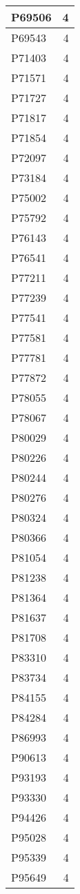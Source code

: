 \documentclass[
]{book}
\theoremstyle{definition}
\theoremstyle{definition}
\theoremstyle{definition}
\theoremstyle{definition}
\theoremstyle{remark}
\begin{document}
\begin{table}
\begin{tabular}{l|r}
\hline
P69506 & 4\\
\hline
P69543 & 4\\
\hline
P71403 & 4\\
\hline
P71571 & 4\\
\hline
P71727 & 4\\
\hline
P71817 & 4\\
\hline
P71854 & 4\\
\hline
P72097 & 4\\
\hline
P73184 & 4\\
\hline
P75002 & 4\\
\hline
P75792 & 4\\
\hline
P76143 & 4\\
\hline
P76541 & 4\\
\hline
P77211 & 4\\
\hline
P77239 & 4\\
\hline
P77541 & 4\\
\hline
P77581 & 4\\
\hline
P77781 & 4\\
\hline
P77872 & 4\\
\hline
P78055 & 4\\
\hline
P78067 & 4\\
\hline
P80029 & 4\\
\hline
P80226 & 4\\
\hline
P80244 & 4\\
\hline
P80276 & 4\\
\hline
P80324 & 4\\
\hline
P80366 & 4\\
\hline
P81054 & 4\\
\hline
P81238 & 4\\
\hline
P81364 & 4\\
\hline
P81637 & 4\\
\hline
P81708 & 4\\
\hline
P83310 & 4\\
\hline
P83734 & 4\\
\hline
P84155 & 4\\
\hline
P84284 & 4\\
\hline
P86993 & 4\\
\hline
P90613 & 4\\
\hline
P93193 & 4\\
\hline
P93330 & 4\\
\hline
P94426 & 4\\
\hline
P95028 & 4\\
\hline
P95339 & 4\\
\hline
P95649 & 4\\

\end{tabular}
\end{table}
\end{document}
